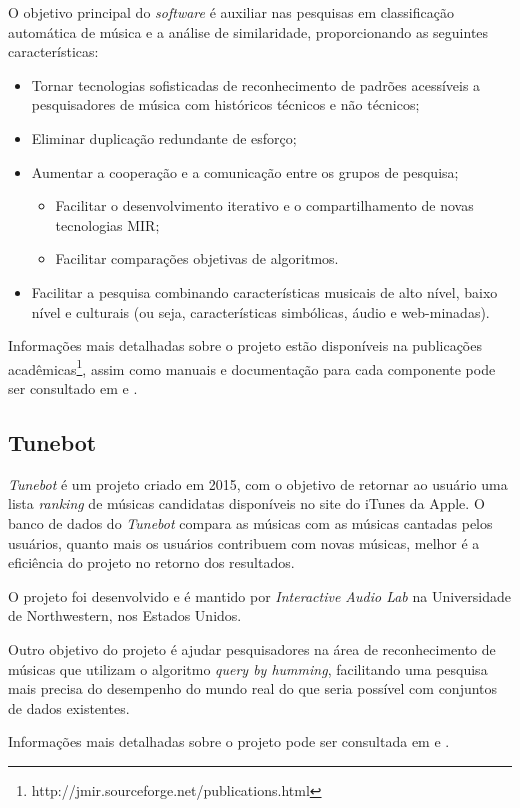 O objetivo principal do \textit{software} é auxiliar nas pesquisas em classificação automática de música e a análise de similaridade, proporcionando as seguintes características:

\begin{itemize}
    \item Tornar tecnologias sofisticadas de reconhecimento de padrões acessíveis a pesquisadores de música com históricos técnicos e não técnicos;
    \item Eliminar duplicação redundante de esforço;
    \item Aumentar a cooperação e a comunicação entre os grupos de pesquisa;
    \begin{itemize}
        \item Facilitar o desenvolvimento iterativo e o compartilhamento de novas tecnologias MIR;
        \item Facilitar comparações objetivas de algoritmos.
    \end{itemize}
    \item Facilitar a pesquisa combinando características musicais de alto nível, baixo nível e culturais (ou seja, características simbólicas, áudio e web-minadas).
\end{itemize}

Informações mais detalhadas sobre o projeto estão disponíveis na publicações acadêmicas\footnote{http://jmir.sourceforge.net/publications.html}, assim como manuais e documentação para cada componente pode ser consultado em \cite{jmir} e \cite{mckay2010}.

\subsection{Tunebot}
\textit{Tunebot} é um projeto criado em 2015, com o objetivo de retornar ao usuário uma lista \textit{ranking} de músicas candidatas disponíveis no site do iTunes da Apple. O banco de dados do \textit{Tunebot} compara as músicas com as músicas cantadas pelos usuários, quanto mais os usuários contribuem com novas músicas, melhor é a eficiência do projeto no retorno dos resultados.

O projeto foi desenvolvido e é mantido por \textit{Interactive Audio Lab} na Universidade de Northwestern, nos Estados Unidos.

Outro objetivo do projeto é ajudar pesquisadores na área de reconhecimento de músicas que utilizam o algoritmo \textit{query by humming}, facilitando uma pesquisa mais precisa do desempenho do mundo real do que seria possível com conjuntos de dados existentes.

Informações mais detalhadas sobre o projeto pode ser consultada em \cite{pardo2012} e \cite{huq2010}.

